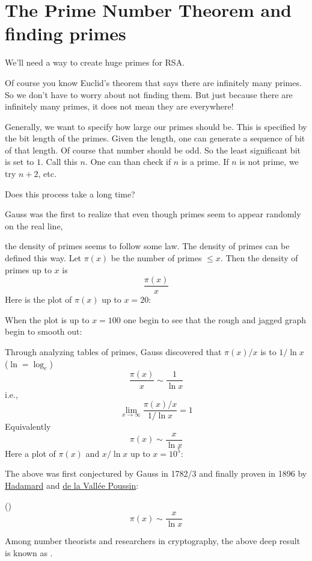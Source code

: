 \section{The Prime Number Theorem and finding primes}

We'll need a way to create huge primes for RSA.

Of course you know Euclid's theorem that says
there are infinitely many primes.
So we don't have to worry about not finding them.
But just because there are infinitely many primes, it does not mean
they are everywhere!

Generally, we want to specify how large our primes should be.
This is specified by the bit length of the primes.
Given the length, one can generate a sequence of bit of that length.
Of course that number should be odd.
So the least significant bit is set to $1$.
Call this $n$.
One can than check if $n$ is a prime.
If $n$ is not prime, we try $n + 2$, etc.

Does this process take a long time?

Gauss was the first to realize that even though primes seem to appear
randomly on the real line,

the density of primes seems to follow some
law.
The density of primes can be defined this way.
Let $\pi(x)$ be the number of primes $\leq x$.
Then the density of primes up to $x$ is
\[
\frac{\pi(x)}{x}
\]
Here is the plot of $\pi(x)$ up to $x = 20$:

When the plot is up to $x = 100$ one begin to see that the
rough and jagged graph begin to smooth out:


Through analyzing tables of primes, Gauss discovered that
$\pi(x)/x$ is  to $1/\ln x$ ($\ln = \log_e$)
\[
\frac{\pi(x)}{x} \sim \frac{1}{\ln x}
\]
i.e.,
\[
\lim_{x \rightarrow \infty} \frac{\pi(x)/x}{1/\ln x} = 1
\]
Equivalently
\[
\pi(x) \sim \frac{x}{\ln x}
\]
Here a plot of $\pi(x)$ and $x/\ln x$ up to $x = 10^5$:


The above was first conjectured by Gauss in 1782/3
and finally proven in 1896 by
\href{https://en.wikipedia.org/wiki/Jacques_Hadamard}{Hadamard}
and
\href{https://en.wikipedia.org/wiki/Charles_Jean_de_la_Vall%C3%A9e_Poussin}{de la Vallée Poussin}:

\begin{thm} \textnormal{()}
\[
\pi(x) \sim \frac{x}{\ln x}
\]  
\end{thm}

Among number theorists and researchers in cryptography,
the above deep result is known as .

